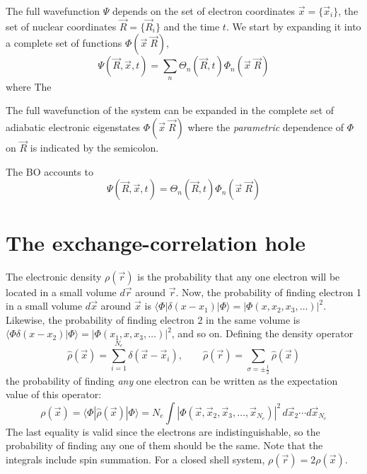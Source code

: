 \documentclass[11pt]{scrbook}   %
\begin{document}
The full wavefunction $\Psi$ depends on the set of electron coordinates $\vec{x}=\{\vec{x}_i\}$, the set of nuclear coordinates $\vec{R}=\{\vec{R}_i\}$ and the time $t$.
We start by expanding it into a complete set of functions $\Phi(\vec{x}\;\vec{R})$,
\begin{equation}
  \Psi(\vec{R},\vec{x},t) = \sum_n \Theta_n(\vec{R},t)\Phi_n(\vec{x}\;\vec{R})
\end{equation}
where 
The 

The full wavefunction of the system can be expanded in the complete set of adiabatic electronic eigenstates $\Phi(\vec{x}\;\vec{R})$
where the \emph{parametric} dependence of $\Phi$ on $\vec{R}$ is indicated by the semicolon.

The BO accounts to
\begin{equation}
  \Psi(\vec{R},\vec{x},t) = \Theta_n(\vec{R},t)\Phi_n(\vec{x}\;\vec{R})
\end{equation}

\section{The exchange-correlation hole}

The electronic density $\rho(\vec{r})$ is the probability that any one electron will be located in a small volume $d\vec{r}$ 
around $\vec{r}$.
Now, the probability of finding electron 1 in a small volume $d\vec{x}$ around $\vec{x}$ is $\langle\Phi|\delta(x-x_1)|\Phi\rangle = |\Phi(x,x_2,x_3,\ldots)|^2$. 
Likewise, the probability of finding electron 2 in the same volume is $\langle\Phi\delta(x-x_2)|\Phi\rangle = |\Phi(x_1,x,x_3,\ldots)|^2$, and so on.
Defining the density operator
\begin{equation}
  \hat{\rho}(\vec{x}) =\sum_{i=1}^{N_e} \delta(\vec{x}-\vec{x}_i),\qquad
  \hat{\rho}(\vec{r}) = \sum_{\sigma=\pm\frac12} \hat{\rho}(\vec{x})
\end{equation}
the probability of finding \emph{any} one electron can be written as the expectation value of this operator:
\begin{equation}
  \rho(\vec{x}) = \langle \Phi | \hat{\rho}(\vec{x}) | \Phi\rangle 
  = N_e \int |\Phi(\vec{x},\vec{x}_2,\vec{x}_3,\ldots,\vec{x}_{N_e} )|^2
 \,d\vec{x}_2\cdots d\vec{x}_{N_e}
\end{equation}
The last equality is valid since the electrons are indistinguishable, so the probability of finding any one of them should be the same.
Note that the integrals include spin summation. For a closed shell system, $\rho(\vec{r}) = 2 \rho(\vec{x})$.
\end{document}
